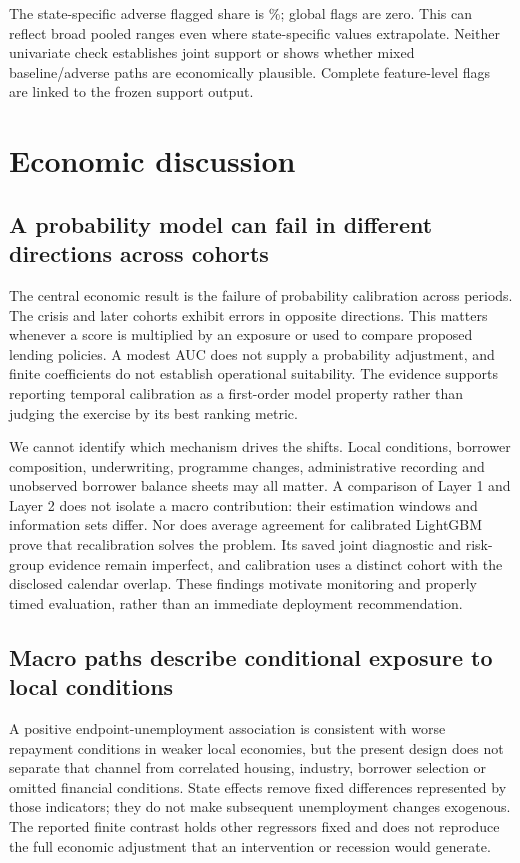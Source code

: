 The state-specific adverse flagged share is \SupportShare\%; global flags are zero. This can reflect broad pooled ranges even where state-specific values extrapolate. Neither univariate check establishes joint support or shows whether mixed baseline/adverse paths are economically plausible. Complete feature-level flags are linked to the frozen support output.

\section{Economic discussion}
\subsection{A probability model can fail in different directions across cohorts}
The central economic result is the failure of probability calibration across periods. The crisis and later cohorts exhibit errors in opposite directions. This matters whenever a score is multiplied by an exposure or used to compare proposed lending policies. A modest AUC does not supply a probability adjustment, and finite coefficients do not establish operational suitability. The evidence supports reporting temporal calibration as a first-order model property rather than judging the exercise by its best ranking metric.

We cannot identify which mechanism drives the shifts. Local conditions, borrower composition, underwriting, programme changes, administrative recording and unobserved borrower balance sheets may all matter. A comparison of Layer 1 and Layer 2 does not isolate a macro contribution: their estimation windows and information sets differ. Nor does average agreement for calibrated LightGBM prove that recalibration solves the problem. Its saved joint diagnostic and risk-group evidence remain imperfect, and calibration uses a distinct cohort with the disclosed calendar overlap. These findings motivate monitoring and properly timed evaluation, rather than an immediate deployment recommendation.

\subsection{Macro paths describe conditional exposure to local conditions}
A positive endpoint-unemployment association is consistent with worse repayment conditions in weaker local economies, but the present design does not separate that channel from correlated housing, industry, borrower selection or omitted financial conditions. State effects remove fixed differences represented by those indicators; they do not make subsequent unemployment changes exogenous. The reported finite contrast holds other regressors fixed and does not reproduce the full economic adjustment that an intervention or recession would generate.

